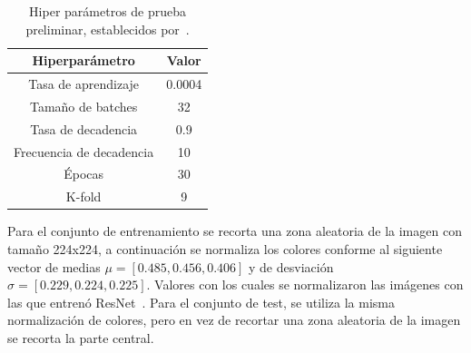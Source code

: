 \begin{table}[htp]
  \scriptsize
  \begin{center}
    \begin{tabular}[c]{|c|c|}
      \hline
      \rowcolor[HTML]{FFC702}
      \textbf{Hiperparámetro} & \textbf{Valor} \\ 
      \hline 
      Tasa de aprendizaje &  0.0004 \\ 
      \hline 
      Tamaño de batches & 32 \\ 
      \hline 
      Tasa de decadencia & 0.9 \\ 
      \hline 
      Frecuencia de decadencia & 10 \\ 
      \hline 
      Épocas & 30 \\ 
      \hline 
      K-fold & 9 \\ 
      \hline 
    \end{tabular}
  \end{center}
  \caption[Hiper parámetros de prueba preliminar.]{Hiper parámetros de prueba preliminar, establecidos por~\cite{VQA-PC}.}
  \label{tab:HiperSJTU}
\end{table}

Para el conjunto de entrenamiento se recorta una zona aleatoria de la imagen con 
tamaño 224x224, a continuación se normaliza los colores conforme al siguiente 
vector de medias $\mu = \left[ 0.485, 0.456, 0.406 \right]$ y de desviación 
$\sigma = \left[ 0.229, 0.224, 0.225 \right]$. Valores con los cuales se 
normalizaron las imágenes con las que entrenó ResNet~\cite{ResNet}.
Para el conjunto de test, se utiliza la misma normalización de colores, pero 
en vez de recortar una zona aleatoria de la imagen se recorta la parte central. 

